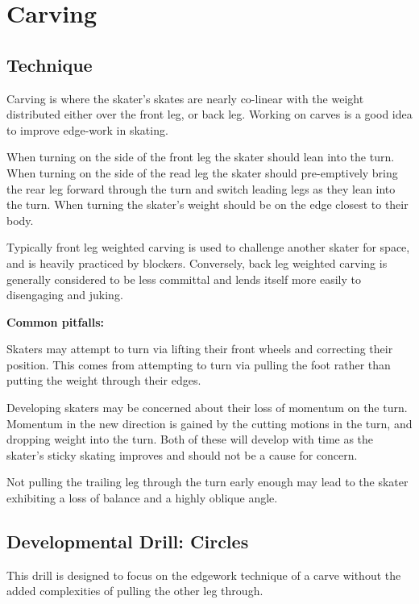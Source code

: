 \section{Carving}
\label{sec:sticky/carves}

\subsection*{Technique}

Carving is where the skater's skates are nearly co-linear with the weight distributed either over the front leg, or back leg.
Working on carves is a good idea to improve edge-work in skating.  


When turning on the side of the front leg the skater should lean into the turn.  
When turning on the side of the read leg the skater should pre-emptively bring the rear leg forward through the turn and switch leading legs as they lean into the turn.  
When turning the skater's weight should be on the edge closest to their body.   


Typically front leg weighted carving is used to challenge another skater for space, and is heavily practiced by blockers.     
Conversely, back leg weighted carving is generally considered to be less committal and lends itself more easily to disengaging and juking.



{\bf Common pitfalls:}

Skaters may attempt to turn via lifting their front wheels and correcting their position.
This comes from attempting to turn via pulling the foot rather than putting the weight through their edges.


Developing skaters may be concerned about their loss of momentum on the turn. 
Momentum in the new direction is gained by the cutting motions in the turn, and dropping weight into the turn.   
Both of these will develop with time as the skater's sticky skating improves and should not be a cause for concern.


Not pulling the trailing leg through the turn early enough may lead to the skater exhibiting a loss of balance and a highly oblique angle.   

\subsection*{Developmental Drill: Circles}

This drill is designed to focus on the edgework technique of a carve without the added complexities of pulling the other leg through.

